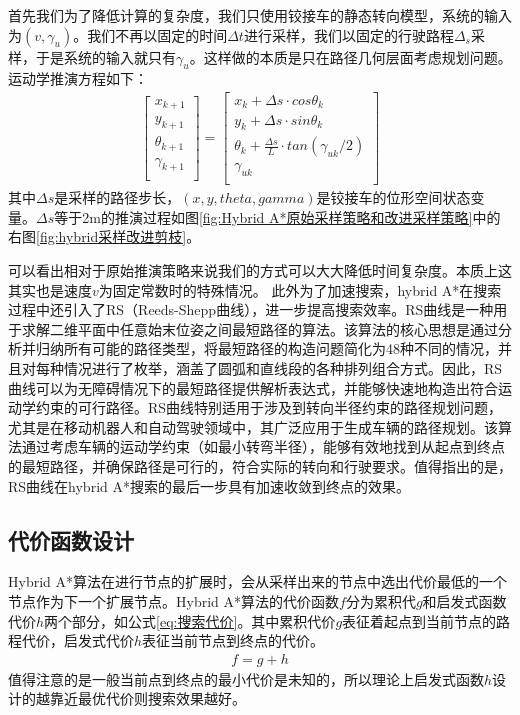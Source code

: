 \documentclass[master,academic]{ysuthesis} %
\begin{document}
		首先我们为了降低计算的复杂度，我们只使用铰接车的静态转向模型，系统的输入为$(v,\gamma_u)$。我们不再以固定的时间$\Delta t$进行采样，我们以固定的行驶路程$\Delta_s$采样，于是系统的输入就只有$\gamma_u$。这样做的本质是只在路径几何层面考虑规划问题。运动学推演方程如下：
		\begin{equation}
			\begin{aligned}
				\left[ \begin{array}{c}
					x_{k+1}\\
					y_{k+1}\\
					\theta _{k+1}\\
					\gamma _{k+1}\\
				\end{array} \right] =\left[ \begin{array}{c}
					x_k+\Delta s\cdot cos\theta _k\\
					y_k+\Delta s\cdot sin\theta _k\\
					\theta _k+\frac{\Delta s}{L}\cdot tan (\gamma _{uk}/2 )\\
					\gamma _{uk}\\
				\end{array} \right] 
			\end{aligned}
			\label{eq:改进运动学推演策略}
		\end{equation}
		其中$\Delta s$是采样的路径步长，$(x,y,theta,gamma)$是铰接车的位形空间状态变量。$\Delta s$等于2m的推演过程如图\ref{fig:Hybrid A*原始采样策略和改进采样策略}中的右图\ref{fig:hybrid采样改进剪枝}。

		可以看出相对于原始推演策略来说我们的方式可以大大降低时间复杂度。本质上这其实也是速度$v$为固定常数时的特殊情况。
		此外为了加速搜索，hybrid A*在搜索过程中还引入了RS（Reeds-Shepp曲线），进一步提高搜索效率。RS曲线是一种用于求解二维平面中任意始末位姿之间最短路径的算法。该算法的核心思想是通过分析并归纳所有可能的路径类型，将最短路径的构造问题简化为48种不同的情况，并且对每种情况进行了枚举，涵盖了圆弧和直线段的各种排列组合方式。因此，RS曲线可以为无障碍情况下的最短路径提供解析表达式，并能够快速地构造出符合运动学约束的可行路径。RS曲线特别适用于涉及到转向半径约束的路径规划问题，尤其是在移动机器人和自动驾驶领域中，其广泛应用于生成车辆的路径规划。该算法通过考虑车辆的运动学约束（如最小转弯半径），能够有效地找到从起点到终点的最短路径，并确保路径是可行的，符合实际的转向和行驶要求。值得指出的是，RS曲线在hybrid A*搜索的最后一步具有加速收敛到终点的效果。

		\subsection{代价函数设计}
		Hybrid A*算法在进行节点的扩展时，会从采样出来的节点中选出代价最低的一个节点作为下一个扩展节点。Hybrid A*算法的代价函数$f$分为累积代$g$和启发式函数代价$h$两个部分，如公式\ref{eq:搜索代价}。其中累积代价$g$表征着起点到当前节点的路程代价，启发式代价$h$表征当前节点到终点的代价。
		\begin{equation}
			\begin{aligned}
				f = g+h
			\end{aligned}
			\label{eq:搜索代价}
		\end{equation}
		值得注意的是一般当前点到终点的最小代价是未知的，所以理论上启发式函数$h$设计的越靠近最优代价则搜索效果越好。
		
\end{document}
